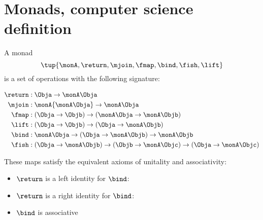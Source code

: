 

\section{Monads, computer science definition}
\label{sec:monads-CS}
 

\begin{definition}\label{def:monad-computer-science}
  A monad \begin{equation}
    \tup{ \monA,\return,\mjoin,\fmap,\bind,\fish,\lift} 
  \end{equation}
  is a set of operations with the following signature:
  
  \begin{align*}
  \return & :\Obja\to\monA \Obja\\
  \mjoin & :\monA{\monA \Obja}\to\monA \Obja\\
  \fmap & :(\Obja\to \Objb)\to(\monA \Obja\to\monA \Objb)\\
  \lift & :(\Obja\to \Objb)\to( \Obja\to\monA \Objb)\\
  \bind & :\monA \Obja\to(\Obja\to\monA \Objb)\to\monA \Objb\\
  \fish & :(\Obja\to\monA \Objb)\to(\Objb\to\monA \Objc)\to(\Obja\to\monA \Objc)
  \end{align*}
  
  These maps satisfy the equivalent axioms of unitality and associativity:
  \begin{itemize}
  \item $\return$ is a left identity for $\bind$:
  
  \item $\return$ is a right identity for $\bind$:
  
  \item $\bind$ is associative
  
  \end{itemize}
\end{definition}
